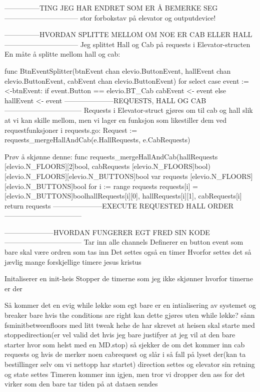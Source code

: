 ---------------TING JEG HAR ENDRET SOM ER Å BEMERKE SEG--------------------------------
stor forbokstav på elevator og outputdevice!



---------------HVORDAN SPLITTE MELLOM OM NOE ER CAB ELLER HALL--------------------------------
Jeg splittet Hall og Cab på requests i Elevator-structen
En måte å splitte mellom hall og cab:

func BtnEventSplitter(btnEvent chan elevio.ButtonEvent,
	hallEvent chan elevio.ButtonEvent,
	cabEvent chan elevio.ButtonEvent) {
	for {
		select {
		case event := <-btnEvent:
			if event.Button == elevio.BT_Cab {
				cabEvent <- event
			} else {
				hallEvent <- event
			}
		}
	}
}
---------------------REQUESTS, HALL OG CAB---------------------------------
Requests i Elevator-struct gjøres om til cab og hall slik at vi kan skille mellom, men vi lager en funksjon 
som likestiller dem ved requestfunksjoner i requests.go:
Request := requests_mergeHallAndCab(e.HallRequests, e.CabRequests)

Prøv å skjønne denne: 
func requests_mergeHallAndCab(hallRequests [elevio.N_FLOORS][2]bool, cabRequests [elevio.N_FLOORS]bool) [elevio.N_FLOORS][elevio.N_BUTTONS]bool {
	var requests [elevio.N_FLOORS][elevio.N_BUTTONS]bool
	for i := range requests {
		requests[i] = [elevio.N_BUTTONS]bool{hallRequests[i][0], hallRequests[i][1], cabRequests[i]}
	}
	return requests
}
---------------------EXECUTE REQUESTED HALL ORDER---------------------------------


---------------------HVORDAN FUNGERER EGT FRED SIN KODE---------------------------------
Tar inn alle channels
Definerer en button event som bare skal være ordren som tas inn
Det settes også en timer
Hvorfor settes det så jævlig mange forskjellige timere jesus kristus

Initaliserer en init-heis
Stopper de timerne som jeg ikke skjønner hvorfor timerne er der

Så kommer det en evig while løkke som egt bare er en intialisering av systemet og breaker bare hvis the conditions are right
kan dette gjøres uten while løkke? sånn fsminitbetweenfloors med litt tweak hehe
    de har skrevet at heisen skal starte med stoppedirection(er vel valid det hvis jeg bare justifyer at jeg vil at den bare starter hvor som helst med en MD.stop)
så sjekker de om det kommer inn cab requests og hvis de merker noen cabrequest
    og slår i så fall på lyset der(kan ta bestillinger selv om vi nettopp har startet)
direction settes og elevator sin retning og state settes
Timeren kommer inn igjen, men tror vi dropper den ass for det virker som den bare tar tiden på at dataen sendes

